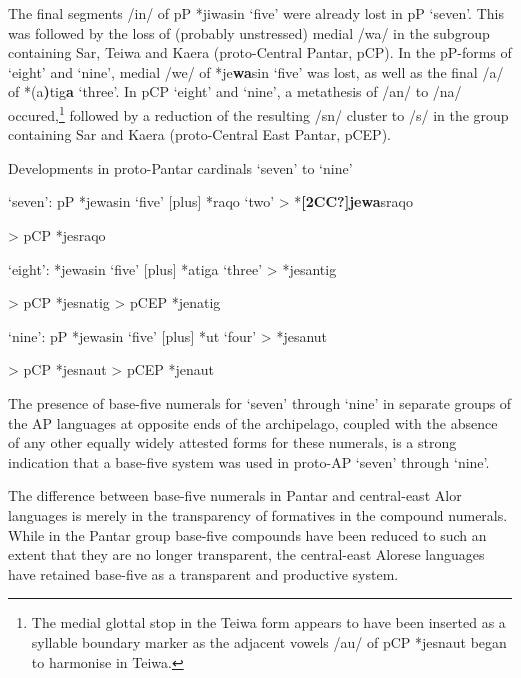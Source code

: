 {  The final segments /in/ of pP *jiwasin `five' were already lost in pP `seven'. This was followed by the loss of (probably unstressed) medial /wa/ in the subgroup containing Sar, Teiwa and Kaera (proto-Central Pantar, pCP). In the pP-forms of `eight' and `nine', medial /we/ of *je\textbf{wa}sin `five' was lost, as well as the final /a/ of *(a\textbf{)}tig\textbf{a} `three'. In pCP `eight' and `nine', a metathesis of /an/ to /na/ occured,\footnote{{}   The medial glottal stop in the Teiwa form appears to have been inserted as a syllable boundary marker as the adjacent vowels /au/ of pCP *jesnaut began to harmonise in Teiwa.}  followed by a reduction of the resulting /sn/ cluster to /s/ in the group containing Sar and Kaera (proto-Central East Pantar, pCEP).

  Developments in proto-Pantar cardinals `seven' to `nine'

\ea%
\label{ex:7}
\ea
  `seven':   pP *jewasin `five' [plus] *raqo `two' {\textgreater} *\textbf{[2CC?]j}\textbf{ewa}s{\textprimstress}raqo

        {\textgreater}  pCP *jesraqo

\ex  `eight':   *jewasin `five' [plus] *atiga `three' {\textgreater} *je{\textprimstress}santig

      {\textgreater} pCP *jesnatig {\textgreater} pCEP *jenatig

\ex  `nine':    pP *jewasin `five' [plus] *ut `four' {\textgreater} *je{\textprimstress}sanut

      {\textgreater} pCP *jesnaut {\textgreater} pCEP *jenaut
\z
\z

The presence of base-five numerals for `seven' through `nine' in separate groups of the AP languages at opposite ends of the archipelago, coupled with the absence of any other equally widely attested forms for these numerals, is a strong indication that a base-five system was used in proto-AP `seven' through `nine'.

The difference between base-five numerals in Pantar and central-east Alor languages is merely in the transparency of formatives in the compound numerals. While in the Pantar group base-five compounds have been reduced to such an extent that they are no longer transparent, the central-east Alorese languages have retained base-five as a transparent and productive system.

}
